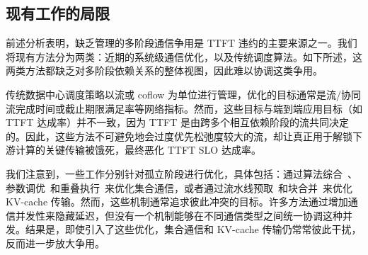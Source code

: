 \subsection{现有工作的局限}
前述分析表明，缺乏管理的多阶段通信争用是 TTFT 违约的主要来源之一。我们将现有方法分为两类：近期的系统级通信优化，以及传统调度算法。如下所述，这两类方法都缺乏对多阶段依赖关系的整体视图，因此难以协调这类争用。

 传统数据中心调度策略以流或 coflow 为单位进行管理，优化的目标通常是流/协同流完成时间或截止期限满足率等网络指标。然而，这些目标与端到端应用目标（如 TTFT 达成率）并不一致，因为 TTFT 是由跨多个相互依赖阶段的流共同决定的。因此，这些方法不可避免地会过度优先松弛度较大的流，却让真正用于解锁下游计算的关键传输被饿死，最终恶化 TTFT SLO 达成率。

我们注意到，一些工作分别针对孤立阶段进行优化，具体包括：通过算法综合~\cite{shah2023taccl,liu2024rethinking,kim2024tccl,cao2025syccl}、参数调优~\cite{xu2025autoccl}和重叠执行~\cite{deepseektech,comet,zheng2025triton,zheng2025tilelink}来优化集合通信，或者通过流水线预取~\cite{splitwise,mooncakefast}和块合并~\cite{strati2024d,chen2024kvdirect,li2025flowkv}来优化 KV-cache 传输。然而，这些机制通常追求彼此冲突的目标。许多方法通过增加通信并发性来隐藏延迟，但没有一个机制能够在不同通信类型之间统一协调这种并发。结果是，即使引入了这些优化，集合通信和 KV-cache 传输仍常常彼此干扰，反而进一步放大争用。
